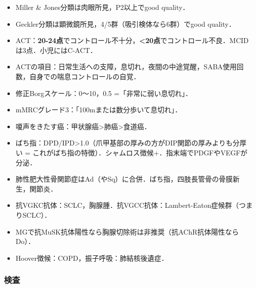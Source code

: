 \begin{itemize}
\item Miller \& Jones分類は肉眼所見，P2以上でgood quality．
\item Geckler分類は顕微鏡所見，4/5群（吸引検体なら6群）でgood quality．
\item ACT：\textbf{20-24点}でコントロール不十分，\textbf{<20点}でコントロール不良．MCIDは3点．小児にはC-ACT．
\item ACTの項目：日常生活への支障，息切れ，夜間の中途覚醒，SABA使用回数，自身での喘息コントロールの自覚．
\item 修正Borgスケール：0〜10，0.5 =「非常に弱い息切れ」．
\item mMRCグレード3：「100mまたは数分歩いて息切れ」．


\item 嗄声をきたす癌：甲状腺癌>肺癌>食道癌．
\item ばち指：DPD/IPD>1.0（爪甲基部の厚みの方がDIP関節の厚みよりも分厚い = これがばち指の特徴）．シャムロス徴候+．指末端でPDGFやVEGFが分泌．
\item 肺性肥大性骨関節症はAd（やSq）に合併．ばち指，四肢長管骨の骨膜新生，関節炎．
\item 抗VGKC抗体：SCLC，胸腺腫．抗VGCC抗体：Lambert-Eaton症候群（つまりSCLC）．
\item MGで抗MuSK抗体陽性なら胸腺切除術は非推奨（抗AChR抗体陽性ならDo）．
\item Hoover徴候：COPD，振子呼吸：肺結核後遺症．
\end{itemize}


\subsubsection{検査}

